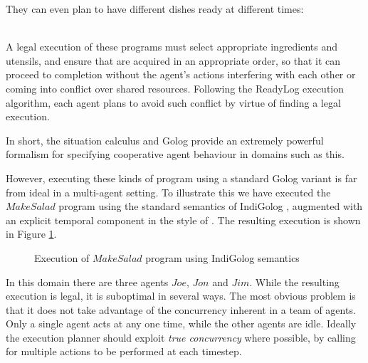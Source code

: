 They can even plan to have different dishes ready at different times:

\\


A legal execution of these programs must select appropriate ingredients
and utensils, and ensure that are acquired in an appropriate order,
so that it can proceed to completion without the agent's actions interfering
with each other or coming into conflict over shared resources. Following
the ReadyLog execution algorithm, each agent plans to avoid such conflict
by virtue of finding a legal execution.

In short, the situation calculus and Golog provide an extremely powerful
formalism for specifying cooperative agent behaviour in domains such
as this.

However, executing these kinds of program using a standard Golog variant
is far from ideal in a multi-agent setting. To illustrate this we
have executed the $MakeSalad$ program using the standard semantics
of IndiGolog \citep{giacomo99indigolog}, augmented with an explicit
temporal component in the style of \citep{Reiter98seq_temp_golog}.
The resulting execution is shown in Figure \ref{fig:MIndiGolog:MakeSalad-in-IndiGolog}.

%
\begin{figure}[t]

\caption{Execution of $MakeSalad$ program using IndiGolog semantics\label{fig:MIndiGolog:MakeSalad-in-IndiGolog}}

\end{figure}


In this domain there are three agents $Joe$, $Jon$ and $Jim$. While
the resulting execution is legal, it is suboptimal in several ways.
The most obvious problem is that it does not take advantage of the
concurrency inherent in a team of agents. Only a single agent acts
at any one time, while the other agents are idle. Ideally the execution
planner should exploit \emph{true concurrency} where possible, by
calling for multiple actions to be performed at each timestep.

